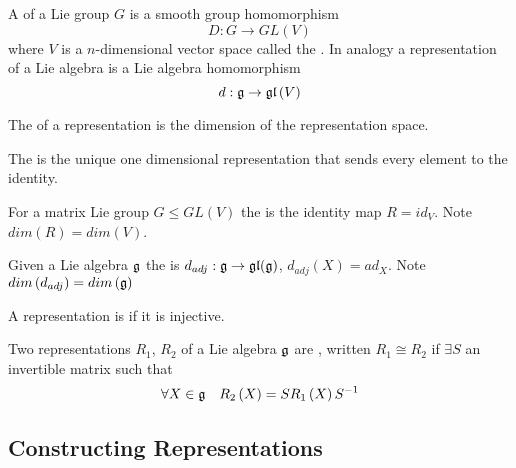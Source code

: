 \documentclass{article}
\begin{document}
\begin{definition}[Representations]
A  of a Lie group $G$ is a smooth group homomorphism 
\[
D:G\to GL\left(V\right)
\]
where $V$ is a $n$-dimensional vector space called the .
In analogy a representation of a Lie algebra is a Lie algebra homomorphism 
\[
d:\mathfrak{g} \to \mathfrak{gl}\left(V\right)
\]
\end{definition}

\begin{definition}[Dimension]
The  of a representation is the dimension of the representation space.
\end{definition}

\begin{definition} 
The  is the unique one dimensional representation that sends every element to the identity. 
\end{definition}

\begin{definition}
For a matrix Lie group $G\leq GL(V)$ the  is the identity map $R=id_V$. Note $dim\left(R\right)=dim\left(V\right)$.
\end{definition}

\begin{definition}
Given a Lie algebra $\mathfrak{g}$ the  is $d_{adj}:\mathfrak{g}\to\mathfrak{gl}(\mathfrak{g})$, $d_{adj}\left(X\right)=ad_X $. Note $dim\left(d_{adj}\right)=dim\left(\mathfrak{g}\right)$
\end{definition}

\begin{definition}
A representation is  if it is injective. 
\end{definition}

\begin{definition}
Two representations $R_1$, $R_2$ of a Lie algebra $\mathfrak{g}$ are , written $R_1 \cong R_2$ if $\exists S$ an invertible matrix such that 
\[
\forall X\in\mathfrak{g} \quad R_2\left(X\right)=S R_1\left(X\right) S^{-1}
\]
\end{definition}
\subsection{Constructing Representations}
\end{document}
